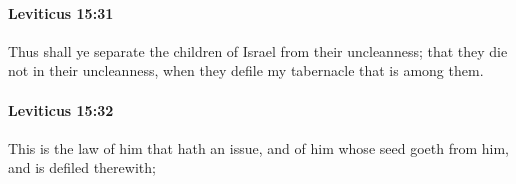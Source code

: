 		\paragraph{Leviticus 15:31} %
			\label{LEVITICUS-15-31}

			Thus shall ye separate the children of Israel from their uncleanness; that they die not in their uncleanness, when they defile my tabernacle that is among them.


		\paragraph{Leviticus 15:32} %
			\label{LEVITICUS-15-32}

			This is the law of him that hath an issue, and of him whose seed goeth from him, and is defiled therewith;


